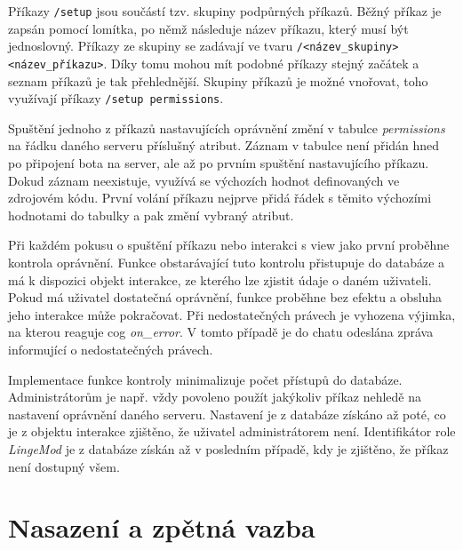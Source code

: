 \documentclass[FM]{tulthesis}
\begin{document}
	Příkazy \verb|/setup| jsou součástí tzv. skupiny podpůrných příkazů. Běžný příkaz je zapsán pomocí lomítka, po němž následuje název příkazu, který musí být jednoslovný. Příkazy ze skupiny se zadávají ve tvaru \verb|/<název_skupiny> <název_příkazu>|. Díky tomu mohou mít podobné příkazy stejný začátek a seznam příkazů je tak přehlednější. Skupiny příkazů je možné vnořovat, toho využívají příkazy \texttt{/setup permissions}.
	
	Spuštění jednoho z příkazů nastavujících oprávnění změní v tabulce \textit{permissions} na řádku daného serveru příslušný atribut. Záznam v tabulce není přidán hned po připojení bota na server, ale až po prvním spuštění nastavujícího příkazu. Dokud záznam neexistuje, využívá se výchozích hodnot definovaných ve zdrojovém kódu. První volání příkazu nejprve přidá řádek s těmito výchozími hodnotami do tabulky a pak změní vybraný atribut.
	
	Při každém pokusu o spuštění příkazu nebo interakci s view jako první proběhne kontrola oprávnění. Funkce obstarávající tuto kontrolu přistupuje do databáze a má k dispozici objekt interakce, ze kterého lze zjistit údaje o daném uživateli. Pokud má uživatel dostatečná oprávnění, funkce proběhne bez efektu a obsluha jeho interakce může pokračovat. Při nedostatečných právech je vyhozena výjimka, na kterou reaguje cog \textit{on\_error}. V tomto případě je do chatu odeslána zpráva informující o nedostatečných právech.
	
	Implementace funkce kontroly minimalizuje počet přístupů do databáze. Administrátorům je např. vždy povoleno použít jakýkoliv příkaz nehledě na nastavení oprávnění daného serveru. Nastavení je z databáze získáno až poté, co je z objektu interakce zjištěno, že uživatel administrátorem není. Identifikátor role \textit{LingeMod} je z databáze získán až v posledním případě, kdy je zjištěno, že příkaz není dostupný všem.
	
		
	\section{Nasazení a zpětná vazba}\label{Chapter5_3}
	
\end{document}
